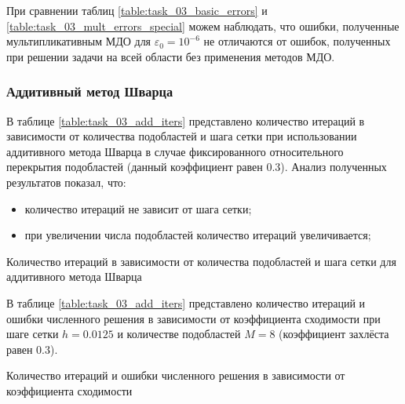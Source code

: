 \documentclass[a4paper]{article}
\begin{document}
При сравнении таблиц \ref{table:task_03_basic_errors} и \ref{table:task_03_mult_errors_special} можем наблюдать, что ошибки, полученные мультипликативным МДО для $\varepsilon_0 = 10^{-6}$ не отличаются от ошибок, полученных при решении задачи на всей области без применения методов МДО. 

\newpage

\subsubsection{Аддитивный метод Шварца}

В таблице \ref{table:task_03_add_iters} представлено количество итераций в зависимости от количества подобластей и шага сетки при использовании аддитивного метода Шварца в случае фиксированного относительного перекрытия подобластей (данный коэффициент равен 0.3). Анализ полученных результатов показал, что:
\begin{itemize}
\item количество итераций не зависит от шага сетки;
\item при увеличении числа подобластей количество итераций увеличивается;
\end{itemize}

\begin{table}[h]
\caption{Количество итераций в зависимости от количества подобластей и шага сетки для аддитивного метода Шварца}
\label{table:task_03_add_iters}
\end{table}

В таблице \ref{table:task_03_add_iters} представлено количество итераций и ошибки численного решения в зависимости от коэффициента сходимости при шаге сетки $h = 0.0125$ и количестве подобластей $M = 8$ (коэффициент захлёста равен 0.3).

\begin{table}[h]
\caption{Количество итераций и ошибки численного решения в зависимости от коэффициента сходимости}
\label{table:task_03_add_errors_special}
\end{table}
\end{document}
